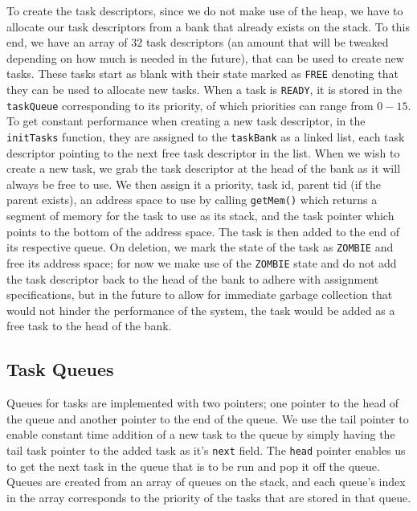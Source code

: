 \documentclass[12pt]{article}
\begin{document}
To create the task descriptors, since we do not make use of the heap, we have to allocate our task descriptors from a bank that already exists on the stack.  To this end, we have an array of $32$ task descriptors (an amount that will be tweaked depending on how much is needed in the future), that can be used to create new tasks.  These tasks start as blank with their state marked as \texttt{FREE} denoting that they can be used to allocate new tasks.  When a task is \texttt{READY}, it is stored in the \texttt{taskQueue} corresponding to its priority, of which priorities can range from $0 - 15$.  To get constant performance when creating a new task descriptor, in the \texttt{initTasks} function, they are assigned to the \texttt{taskBank} as a linked list, each task descriptor pointing to the next free task descriptor in the list.  When we wish to create a new task, we grab the task descriptor at the head of the bank as it will always be free to use.  We then assign it a priority, task id, parent tid (if the parent exists), an address space to use by calling \texttt{getMem()} which returns a segment of memory for the task to use as its stack, and the task pointer which points to the bottom of the address space.  The task is then added to the end of its respective queue.  On deletion, we mark the state of the task as \texttt{ZOMBIE} and free its address space; for now we make use of the \texttt{ZOMBIE} state and do not add the task descriptor back to the head of the bank to adhere with assignment specifications, but in the future to allow for immediate garbage collection that would not hinder the performance of the system, the task would be added as a free task to the head of the bank.
\\[1\baselineskip]
\subsection{Task Queues}
Queues for tasks are implemented with two pointers; one pointer to the head of the queue and another pointer to the end of the queue.  We use the tail pointer to enable constant time addition of a new task to the queue by simply having the tail task pointer to the added task as it's \texttt{next} field.  The \texttt{head} pointer enables us to get the next task in the queue that is to be run and pop it off the queue.  Queues are created from an array of queues on the stack, and each queue's index in the array corresponds to the priority of the tasks that are stored in that queue.
\\[1\baselineskip]
\end{document}
